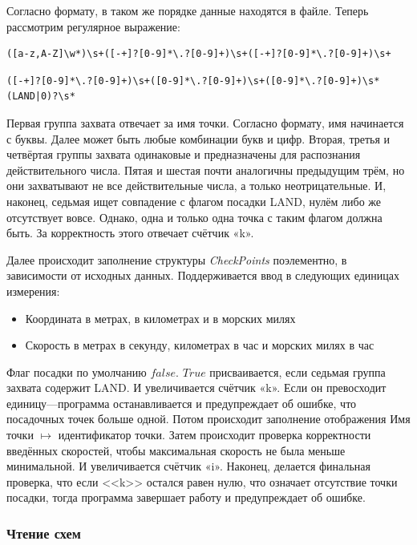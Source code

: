\documentclass[12pt, a4 paper]{article}
\theoremstyle{plain}
\begin{document}
Согласно формату, в таком же порядке данные находятся в файле. Теперь рассмотрим регулярное выражение:

\begin{verbatim}
([a-z,A-Z]\w*)\s+([-+]?[0-9]*\.?[0-9]+)\s+([-+]?[0-9]*\.?[0-9]+)\s+
\end{verbatim}

\begin{verbatim}
([-+]?[0-9]*\.?[0-9]+)\s+([0-9]*\.?[0-9]+)\s+([0-9]*\.?[0-9]+)\s*(LAND|0)?\s*
\end{verbatim}

Первая группа захвата отвечает за имя точки. Согласно формату, имя начинается с буквы. Далее может быть любые комбинации букв и цифр.
Вторая, третья и четвёртая группы захвата одинаковые и предназначены для распознания действительного числа.
Пятая и шестая почти аналогичны предыдущим трём, но они захватывают не все действительные числа, а только неотрицательные.
И, наконец, седьмая ищет совпадение с флагом посадки LAND, нулём либо же отсутствует вовсе. Однако, одна и только одна точка с таким флагом должна быть. За корректность этого отвечает счётчик «k».

Далее происходит заполнение структуры \textit{CheckPoints} поэлементно, в зависимости от исходных данных. Поддерживается ввод в следующих единицах измерения: 
\begin{itemize}
	\item Координата в метрах, в километрах и в морских милях
	\item Скорость в метрах в секунду, километрах в час и морских милях в час
\end{itemize}

Флаг посадки по умолчанию $false$. $True$ присваивается, если седьмая группа захвата содержит LAND. И увеличивается счётчик «k». Если он превосходит единицу---программа останавливается и предупреждает об ошибке, что посадочных точек больше одной. Потом происходит заполнение отображения Имя точки $\mapsto$ идентификатор точки.
Затем происходит проверка корректности введённых скоростей, чтобы максимальная скорость не была меньше минимальной. И увеличивается счётчик «i».
Наконец, делается финальная проверка, что если <<k>> остался равен нулю, что означает отсутствие точки посадки, тогда программа завершает работу и предупреждает об ошибке.




\subsubsection{Чтение схем}
\end{document}
